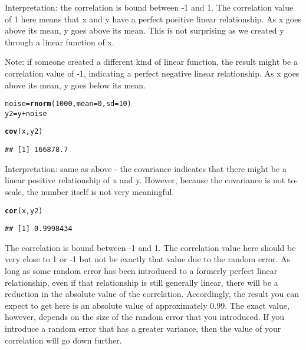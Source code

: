 \documentclass[12pt,letter]{article}\usepackage[]{graphicx}\usepackage[]{color}
\makeatletter
\newcommand{\hlnum}[1]{\textcolor[rgb]{0.686,0.059,0.569}{#1}}%
\newcommand{\hlopt}[1]{\textcolor[rgb]{0,0,0}{#1}}%
\newcommand{\hlstd}[1]{\textcolor[rgb]{0.345,0.345,0.345}{#1}}%
\newcommand{\hlkwb}[1]{\textcolor[rgb]{0.69,0.353,0.396}{#1}}%
\newcommand{\hlkwc}[1]{\textcolor[rgb]{0.333,0.667,0.333}{#1}}%
\newcommand{\hlkwd}[1]{\textcolor[rgb]{0.737,0.353,0.396}{\textbf{#1}}}%
\newenvironment{kframe}{%
 \def\at@end@of@kframe{}%
 \ifinner\ifhmode%
  \def\at@end@of@kframe{\end{minipage}}%
  \begin{minipage}{\columnwidth}%
 \fi\fi%
 \def\FrameCommand##1{\hskip\@totalleftmargin \hskip-\fboxsep
 \colorbox{shadecolor}{##1}\hskip-\fboxsep
     \hskip-\linewidth \hskip-\@totalleftmargin \hskip\columnwidth}%
 \MakeFramed {\advance\hsize-\width
   \@totalleftmargin\z@ \linewidth\hsize
   \@setminipage}}%
 {\par\unskip\endMakeFramed%
 \at@end@of@kframe}
\newenvironment{knitrout}{}{} %
\makeatother
\begin{document}
Interpretation: the correlation is bound between -1 and 1. The correlation value of 1 here means that x and y have a perfect positive linear relationship. As x goes above its mean, y goes above its mean. This is not surprising as we created y through a linear function of x.

Note: if someone created a different kind of linear function, the result might be a correlation value of -1, indicating a perfect negative linear relationship. As x goes above its mean, y goes below its mean.

\begin{knitrout}
\color{fgcolor}\begin{kframe}
\begin{alltt}
\hlstd{noise} \hlkwb{=} \hlkwd{rnorm}\hlstd{(}\hlnum{1000}\hlstd{,} \hlkwc{mean} \hlstd{=} \hlnum{0}\hlstd{,} \hlkwc{sd} \hlstd{=} \hlnum{10}\hlstd{)}
\hlstd{y2} \hlkwb{=} \hlstd{y} \hlopt{+} \hlstd{noise}

\hlkwd{cov}\hlstd{(x, y2)}
\end{alltt}
\begin{verbatim}
## [1] 166878.7
\end{verbatim}
\end{kframe}
\end{knitrout}

Interpretation: same as above - the covariance indicates that there might be a linear positive relationship of x and y. However, because the covariance is not to-scale, the number itself is not very meaningful.

\begin{knitrout}
\color{fgcolor}\begin{kframe}
\begin{alltt}
\hlkwd{cor}\hlstd{(x, y2)}
\end{alltt}
\begin{verbatim}
## [1] 0.9998434
\end{verbatim}
\end{kframe}
\end{knitrout}

The correlation is bound between -1 and 1. The correlation value here should be very close to 1 or -1 but not be exactly that value due to the random error. As long as some random error has been introduced to a formerly perfect linear relationship, even if that relationship is still generally linear, there will be a reduction in the absolute value of the correlation. Accordingly, the result you can expect to get here is an absolute value of approximately 0.99. The exact value, however, depends on the size of the random error that you introduced. If you introduce a random error that has a greater variance, then the value of your correlation will go down further.
\end{document}
